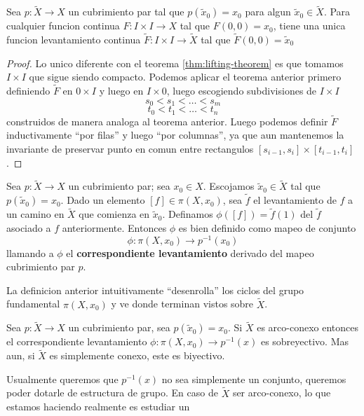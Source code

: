 \begin{corolario}
  Sea \(p : \tilde X \to X\) un cubrimiento par tal que \(p(\tilde x _0)
  = x_0 \) para algun \(\tilde x _0 \in \tilde X\). Para cualquier
  funcion continua \(F : I \times I \to X\) tal que \(F(0,0) = x_0\), tiene una
  unica funcion levantamiento continua \(\tilde F : I \times I \to \tilde X\) tal
  que \(\tilde F (0,0) = \tilde x_0\)
\end{corolario}
\begin{proof}
  Lo unico diferente con el teorema \ref{thm:lifting-theorem} es que
  tomamos \(I \times I\) que sigue siendo compacto. Podemos aplicar el
  teorema anterior primero definiendo \(\tilde F\) en \(0 \times I\) y
  luego en \(I \times 0\), luego escogiendo subdivisiones de \(I \times
  I\)
  \[ s_0 < s_1 < \dotsc < s_m \]
  \[ t_0 < t_1 < \dotsc < t_n \]
  construidos de manera analoga al teorema anterior. Luego podemos
  definir \(\tilde F\) inductivamente ``por filas'' y luego ``por
  columnas'', ya que aun mantenemos la invariante de preservar punto en
  comun entre rectangulos \([s_{i-1}, s_i] \times [t_{i-1}, t_i]\).
\end{proof}
\begin{definicion}
  Sea \(p : \tilde X \to X\) un cubrimiento par; sea \(x_0 \in X\).
  Escojamos \(\tilde x _0 \in \tilde X\) tal que \(p(\tilde x _0) =
  x_0\). Dado un elemento \([f] \in \pi (X, x_0)\), sea \(\tilde f\) el
  levantamiento de \(f\) a un camino en \(\tilde X\) que comienza en
  \(\tilde x _0\). Definamos \(\phi ([f]) = \tilde f (1)\) del \(\tilde
  f\) asociado a \(f\) anteriormente. Entonces \(\phi\) es bien definido
  como mapeo de conjunto
  \[ \phi : \pi (X, x_0) \to p^{-1} (x_0)\]
  llamando a \(\phi\) el \textbf{correspondiente levantamiento} derivado
  del mapeo cubrimiento par \(p\).
\end{definicion}
La definicion anterior intuitivamente ``desenrolla'' los ciclos del
grupo fundamental \(\pi (X,x_0)\) y ve donde terminan vistos sobre
\(\tilde X\).
\begin{teorema}
  Sea \(p : \tilde X \to X\) un cubrimiento par, sea \(p (\tilde x _0) =
  x_0\). Si \(\tilde X\) es arco-conexo entonces el correspondiente
  levantamiento \(\phi : \pi (X, x _0) \to p^{-1} (x)\) es sobreyectivo.
  Mas aun, si \(\tilde X\) es simplemente conexo, este es biyectivo.
\end{teorema}
Usualmente queremos que \(p^{-1} (x)\) no sea simplemente un conjunto,
queremos poder dotarle de estructura de grupo. En caso de \(\tilde X\)
ser arco-conexo, lo que estamos haciendo realmente es estudiar un
